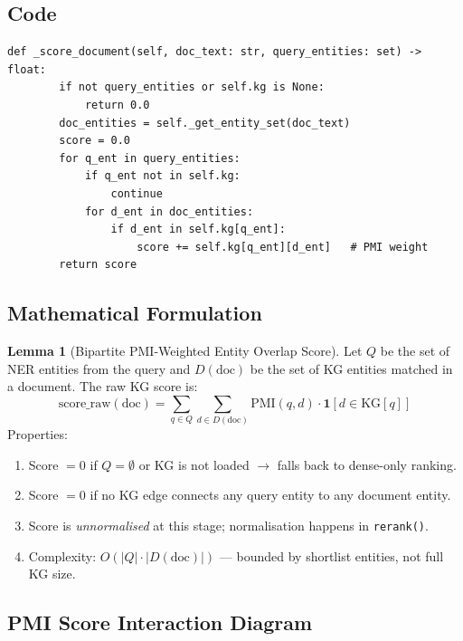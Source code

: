\documentclass[12pt,a4paper]{article}
\theoremstyle{definition}
\newtheorem{lemma}[theorem]{Lemma}
\theoremstyle{remark}
\begin{document}
\subsection{Code}

\begin{lstlisting}[caption={\texttt{NERKGReranker.\_score\_document()}}]
    def _score_document(self, doc_text: str, query_entities: set) -> float:
        if not query_entities or self.kg is None:
            return 0.0
        doc_entities = self._get_entity_set(doc_text)
        score = 0.0
        for q_ent in query_entities:
            if q_ent not in self.kg:
                continue
            for d_ent in doc_entities:
                if d_ent in self.kg[q_ent]:
                    score += self.kg[q_ent][d_ent]   # PMI weight
        return score
\end{lstlisting}

\subsection{Mathematical Formulation}

\begin{lemma}[Bipartite PMI-Weighted Entity Overlap Score]
Let $Q$ be the set of NER entities from the query and
$D(\text{doc})$ be the set of KG entities matched in a document.
The raw KG score is:
\[
  \text{score\_raw}(\text{doc})
  = \sum_{q \in Q} \sum_{d \in D(\text{doc})}
    \text{PMI}(q, d)
    \cdot \mathbf{1}\!\left[d \in \text{KG}[q]\right]
\]
Properties:
\begin{enumerate}
  \item Score $= 0$ if $Q = \emptyset$ or KG is not loaded $\to$ falls back to dense-only ranking.
  \item Score $= 0$ if no KG edge connects any query entity to any document entity.
  \item Score is \emph{unnormalised} at this stage; normalisation happens in \texttt{rerank()}.
  \item Complexity: $O(|Q| \cdot |D(\text{doc})|)$ --- bounded by shortlist entities, not full KG size.
\end{enumerate}
\end{lemma}

\subsection{PMI Score Interaction Diagram}
\end{document}

